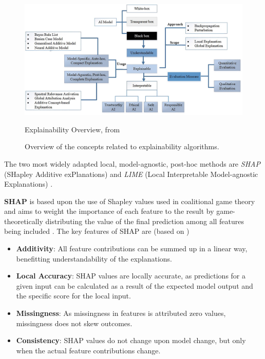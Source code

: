 \begin{figure}[h]
    \centering
    \includegraphics[width=1\textwidth]{images/CH02_algorithms_overview_Saleem.jpg}
    \caption{Explainability Overview, from \cite{SALEEM2022165}}
    \caption*{Overview of the concepts related to explainability algorithms.}
    \label{fig:Explainability_overview}
\end{figure}

The two most widely adapted local, model-agnostic, post-hoc methods are \textit{SHAP} (SHapley Additive exPlanations) \parencite{Lundberg2017} and \textit{LIME} (Local Interpretable Model-agnostic Explanations) \parencite{Ribeiro2016}.

\textbf{SHAP} is based upon the use of Shapley values used in coalitional game theory and aims to weight the importance of each feature to the result by game-theoretically distributing the value of the final prediction among all features being included \parencite{Molnar2023}.
The key features of SHAP are (based on \cite{Molnar2023})
\begin{itemize}
    \item \textbf{Additivity}: All feature contributions can be summed up in a linear way, benefitting understandability of the explanations.
    \item \textbf{Local Accuracy}: SHAP values are locally accurate, as predictions for a given input can be calculated as a result of the expected model output and the specific score for the local input.
    \item \textbf{Missingness}: As missingness in features is attributed zero values, missingness does not skew outcomes.
    \item \textbf{Consistency}: SHAP values do not change upon model change, but only when the actual feature contributions change.
\end{itemize}

